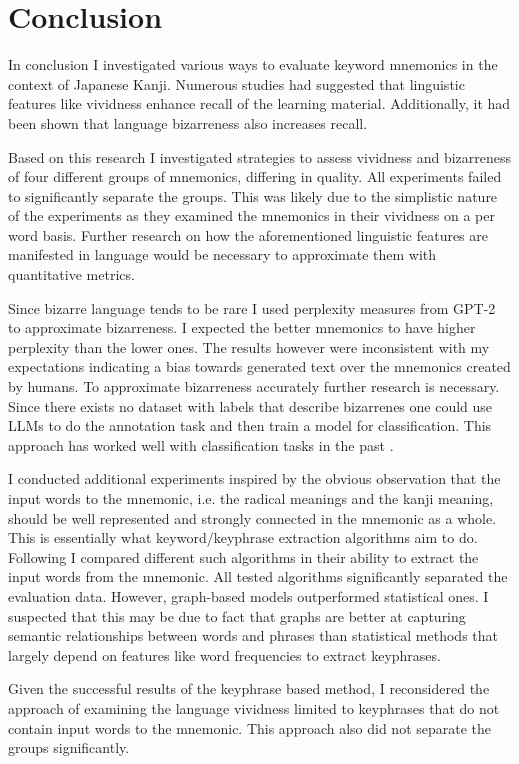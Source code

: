 \section{Conclusion} \label{sec:conclusion}
In conclusion I investigated various ways to evaluate keyword mnemonics in the context of Japanese Kanji. Numerous studies had suggested that linguistic features like vividness enhance recall of the learning material. Additionally, it had been shown that language bizarreness also increases recall. 

Based on this research I investigated strategies to assess vividness and bizarreness of four different groups of mnemonics, differing in quality. All experiments failed to significantly separate the groups. This was likely due to the simplistic nature of the experiments as they examined the mnemonics in their vividness on a per word basis. Further research on how the aforementioned linguistic features are manifested in language would be necessary to approximate them with quantitative metrics.

Since bizarre language tends to be rare I used perplexity measures from GPT-2 to approximate bizarreness. I expected the better mnemonics to have higher perplexity than the lower ones. The results however were inconsistent with my expectations indicating a bias towards generated text over the mnemonics created by humans. To approximate bizarreness accurately further research is necessary. Since there exists no dataset with labels that describe bizarrenes one could use LLMs to do the annotation task and then train a model for classification. This approach has worked well with classification tasks in the past \cite{ding2022gpt3}. 

I conducted additional experiments inspired by the obvious observation that the input words to the mnemonic, i.e. the radical meanings and the kanji meaning, should be well represented and strongly connected in the mnemonic as a whole. This is essentially what keyword/keyphrase extraction algorithms aim to do. Following I compared different such algorithms in their ability to extract the input words from the mnemonic. All tested algorithms significantly separated the evaluation data. However, graph-based models outperformed statistical ones. I suspected that this may be due to fact that graphs are better at capturing semantic relationships between words and phrases than statistical methods that largely depend on features like word frequencies to extract keyphrases. 

Given the successful results of the keyphrase based method, I reconsidered the approach of examining the language vividness limited to keyphrases that do not contain input words to the mnemonic. This approach also did not separate the groups significantly.

